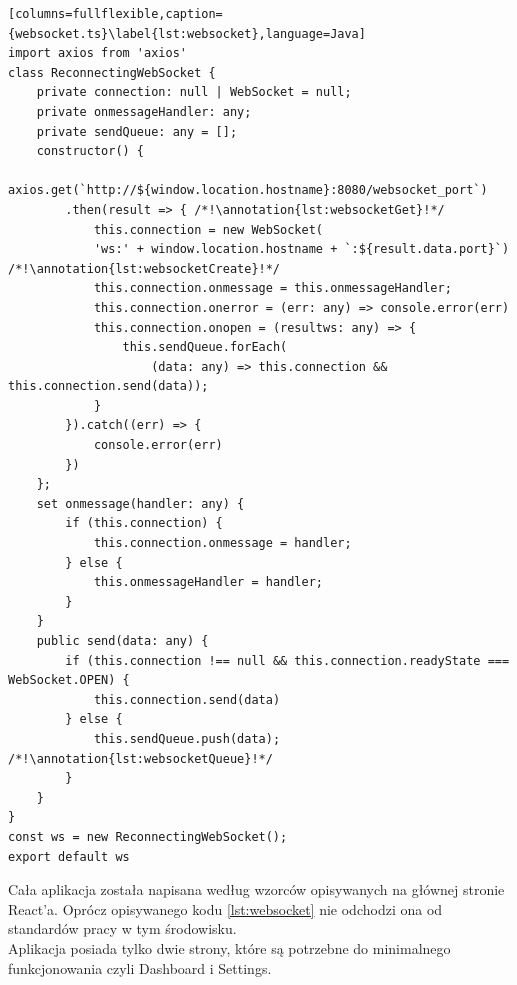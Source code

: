 \begin{lstlisting}[columns=fullflexible,caption={websocket.ts}\label{lst:websocket},language=Java]
import axios from 'axios'
class ReconnectingWebSocket {
    private connection: null | WebSocket = null;
    private onmessageHandler: any;
    private sendQueue: any = [];
    constructor() {
        axios.get(`http://${window.location.hostname}:8080/websocket_port`)
        .then(result => { /*!\annotation{lst:websocketGet}!*/
            this.connection = new WebSocket(
            'ws:' + window.location.hostname + `:${result.data.port}`) /*!\annotation{lst:websocketCreate}!*/
            this.connection.onmessage = this.onmessageHandler;
            this.connection.onerror = (err: any) => console.error(err)
            this.connection.onopen = (resultws: any) => {
                this.sendQueue.forEach(
                    (data: any) => this.connection && this.connection.send(data));
            }
        }).catch((err) => {
            console.error(err)
        })
    };
    set onmessage(handler: any) {
        if (this.connection) {
            this.connection.onmessage = handler;
        } else {
            this.onmessageHandler = handler;
        }
    }
    public send(data: any) {
        if (this.connection !== null && this.connection.readyState === WebSocket.OPEN) {
            this.connection.send(data)
        } else {
            this.sendQueue.push(data); /*!\annotation{lst:websocketQueue}!*/
        }
    }
}
const ws = new ReconnectingWebSocket();
export default ws
\end{lstlisting} \newpage
\par Cała aplikacja została napisana według wzorców opisywanych na głównej stronie React'a. Oprócz opisywanego kodu \ref{lst:websocket} nie odchodzi ona od standardów pracy w tym środowisku. \cite{React}\\
Aplikacja posiada tylko dwie strony, które są potrzebne do minimalnego funkcjonowania czyli Dashboard i Settings.
